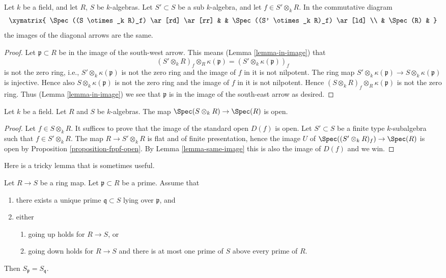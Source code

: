 \begin{lemma}
\label{lemma-same-image}
Let $k$ be a field, and let $R$, $S$ be $k$-algebras.
Let $S' \subset S$ be a sub $k$-algebra, and let $f \in S' \otimes_k R$.
In the commutative diagram
$$
\xymatrix{
\Spec((S \otimes_k R)_f) \ar[rd] \ar[rr] & &
\Spec((S' \otimes_k R)_f) \ar[ld] \\
& \Spec(R) &
}
$$
the images of the diagonal arrows are the same.
\end{lemma}

\begin{proof}
Let $\mathfrak p \subset R$ be in the image of the south-west
arrow. This means (Lemma \ref{lemma-in-image}) that
$$
(S' \otimes_k R)_f \otimes_R \kappa(\mathfrak p)
=
(S' \otimes_k \kappa(\mathfrak p))_f
$$
is not the zero ring, i.e., $S' \otimes_k \kappa(\mathfrak p)$
is not the zero ring and the image of $f$ in it is not nilpotent.
The ring map
$S' \otimes_k \kappa(\mathfrak p) \to S \otimes_k \kappa(\mathfrak p)$
is injective. Hence also $S \otimes_k \kappa(\mathfrak p)$
is not the zero ring and the image of $f$ in it is not nilpotent.
Hence $(S \otimes_k R)_f \otimes_R \kappa(\mathfrak p)$
is not the zero ring. Thus (Lemma \ref{lemma-in-image})
we see that $\mathfrak p$ is in the image of the south-east arrow
as desired.
\end{proof}

\begin{lemma}
\label{lemma-map-into-tensor-algebra-open}
Let $k$ be a field.
Let $R$ and $S$ be $k$-algebras.
The map $\Spec(S \otimes_k R) \to \Spec(R)$
is open.
\end{lemma}

\begin{proof}
Let $f \in S \otimes_k R$.
It suffices to prove that the image of the standard open $D(f)$ is open.
Let $S' \subset S$ be a finite type $k$-subalgebra such that
$f \in S' \otimes_k R$. The map $R \to S' \otimes_k R$ is flat
and of finite presentation, hence the image $U$ of
$\Spec((S' \otimes_k R)_f) \to \Spec(R)$ is open
by Proposition \ref{proposition-fppf-open}.
By Lemma \ref{lemma-same-image} this is also the image of $D(f)$ and we win.
\end{proof}

\noindent
Here is a tricky lemma that is sometimes useful.

\begin{lemma}
\label{lemma-unique-prime-over-localize-below}
Let $R \to S$ be a ring map.
Let $\mathfrak p \subset R$ be a prime.
Assume that
\begin{enumerate}
\item there exists a unique prime $\mathfrak q \subset S$ lying over
$\mathfrak p$, and
\item either
\begin{enumerate}
\item going up holds for $R \to S$, or
\item going down holds for $R \to S$ and there is at most one prime
of $S$ above every prime of $R$.
\end{enumerate}
\end{enumerate}
Then $S_{\mathfrak p} = S_{\mathfrak q}$.
\end{lemma}

